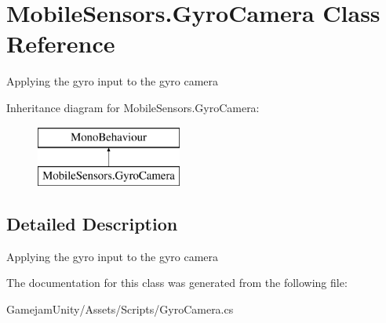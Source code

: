 \hypertarget{class_mobile_sensors_1_1_gyro_camera}{}\section{Mobile\+Sensors.\+Gyro\+Camera Class Reference}
\label{class_mobile_sensors_1_1_gyro_camera}


Applying the gyro input to the gyro camera  


Inheritance diagram for Mobile\+Sensors.\+Gyro\+Camera\+:\begin{figure}[H]
\begin{center}
\leavevmode
\includegraphics[height=2.000000cm]{class_mobile_sensors_1_1_gyro_camera}
\end{center}
\end{figure}


\subsection{Detailed Description}
Applying the gyro input to the gyro camera 



The documentation for this class was generated from the following file\+:\begin{DoxyCompactItemize}
\item 
Gamejam\+Unity/\+Assets/\+Scripts/Gyro\+Camera.\+cs\end{DoxyCompactItemize}
